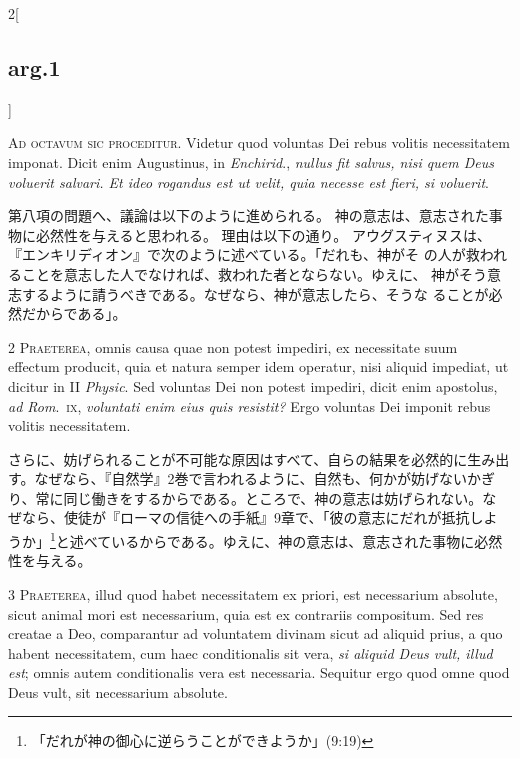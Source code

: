 \documentclass[paper=a4paper,fontsize=10pt,jafontsize=9pt,titlepage]{jlreq}
\begin{document}
\begin{paracol}{2}[\subsection{arg.1}]


{\huge A}{\scshape d octavum sic proceditur}. Videtur quod
voluntas Dei rebus volitis necessitatem imponat. Dicit enim Augustinus,
in {\itshape Enchirid}., {\itshape nullus fit salvus, nisi quem Deus voluerit salvari. Et
ideo rogandus est ut velit, quia necesse est fieri, si voluerit}.

\switchcolumn

第八項の問題へ、議論は以下のように進められる。
神の意志は、意志された事物に必然性を与えると思われる。
理由は以下の通り。
アウグスティヌスは、『エンキリディオン』で次のように述べている。「だれも、神がそ
 の人が救われることを意志した人でなければ、救われた者とならない。ゆえに、
 神がそう意志するように請うべきである。なぜなら、神が意志したら、そうな
 ることが必然だからである」。



{\scshape 2 Praeterea}, omnis causa quae non potest
impediri, ex necessitate suum effectum producit, quia et natura semper
idem operatur, nisi aliquid impediat, ut dicitur in II {\itshape Physic}. Sed
voluntas Dei non potest impediri, dicit enim apostolus, {\itshape ad Rom}.~{\scshape ix},
{\itshape voluntati enim eius quis resistit?} Ergo voluntas Dei imponit rebus
volitis necessitatem.

\switchcolumn

さらに、妨げられることが不可能な原因はすべて、自らの結果を必然的に生み出
 す。なぜなら、『自然学』2巻で言われるように、自然も、何かが妨げないかぎ
 り、常に同じ働きをするからである。ところで、神の意志は妨げられない。な
 ぜなら、使徒が『ローマの信徒への手紙』9章で、「彼の意志にだれが抵抗しよ
 うか」\footnote{「だれが神の御心に逆らうことができようか」(9:19)}と述べているからである。ゆえに、神の意志は、意志された事物に必然
 性を与える。



{\scshape 3 Praeterea}, illud quod habet necessitatem ex
priori, est necessarium absolute, sicut animal mori est necessarium,
quia est ex contrariis compositum. Sed res creatae a Deo, comparantur ad
voluntatem divinam sicut ad aliquid prius, a quo habent necessitatem,
cum haec conditionalis sit vera, {\itshape si aliquid Deus vult, illud est}; omnis
autem conditionalis vera est necessaria. Sequitur ergo quod omne quod
Deus vult, sit necessarium absolute.


\end{paracol}
\end{document}
